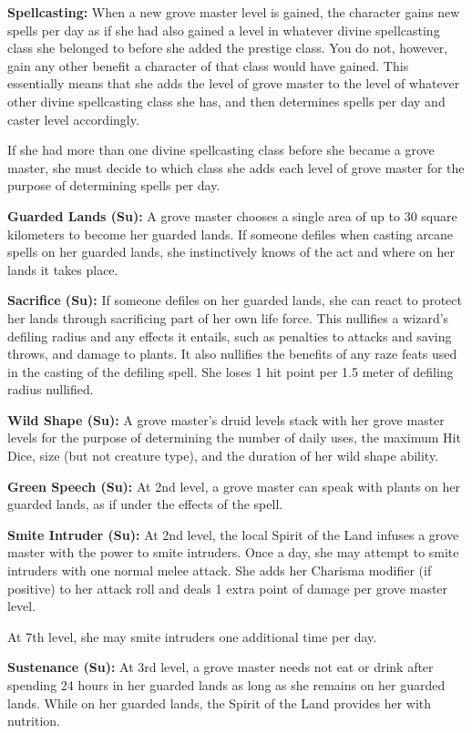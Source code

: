 {
\textbf{Spellcasting:} When a new grove master level is gained, the character gains new spells per day as if she had also gained a level in whatever divine spellcasting class she belonged to before she added the prestige class. You do not, however, gain any other benefit a character of that class would have gained. This essentially means that she adds the level of grove master to the level of whatever other divine spellcasting class she has, and then determines spells per day and caster level accordingly.

If she had more than one divine spellcasting class before she became a grove master, she must decide to which class she adds each level of grove master for the purpose of determining spells per day.

\textbf{Guarded Lands (Su):} A grove master chooses a single area of up to 30 square kilometers to become her guarded lands. If someone defiles when casting arcane spells on her guarded lands, she instinctively knows of the act and where on her lands it takes place.

\textbf{Sacrifice (Su):} If someone defiles on her guarded lands, she can react to protect her lands through sacrificing part of her own life force. This nullifies a wizard's defiling radius and any effects it entails, such as penalties to attacks and saving throws, and damage to plants. It also nullifies the benefits of any raze feats used in the casting of the defiling spell. She loses 1 hit point per 1.5 meter of defiling radius nullified.

\textbf{Wild Shape (Su):} A grove master's druid levels stack with her grove master levels for the purpose of determining the number of daily uses, the maximum Hit Dice, size (but not creature type), and the duration of her wild shape ability.

\textbf{Green Speech (Su):} At 2nd level, a grove master can speak with plants on her guarded lands, as if under the effects of the  spell.

\textbf{Smite Intruder (Su):} At 2nd level, the local Spirit of the Land infuses a grove master with the power to smite intruders. Once a day, she may attempt to smite intruders with one normal melee attack. She adds her Charisma modifier (if positive) to her attack roll and deals 1 extra point of damage per grove master level.

At 7th level, she may smite intruders one additional time per day.

\textbf{Sustenance (Su):} At 3rd level, a grove master needs not eat or drink after spending 24 hours in her guarded lands as long as she remains on her guarded lands. While on her guarded lands, the Spirit of the Land provides her with nutrition. 

}
